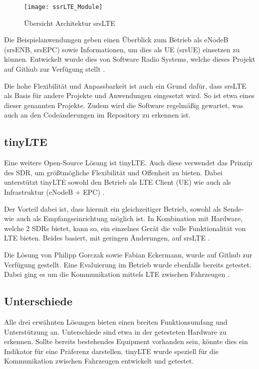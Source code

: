 \begin{figure*}[ht]
	\centering
	\texttt{[image: ssrLTE\_Module]}
	\caption{Übersicht Architektur srsLTE \protect\cite{puschmann2017implementing}}
	\label{fig:modulessrsLTE}
\end{figure*}

Die Beispielanwendungen geben einen Überblick zum Betrieb als eNodeB (srsENB, srsEPC) sowie Informationen, um dies als UE (srsUE) einsetzen zu können. Entwickelt wurde dies von Software Radio Systems, welche dieses Projekt auf Github zur Verfügung stellt \cite{githubSrSLTE}.

Die hohe Flexibilität und Anpassbarkeit ist auch ein Grund dafür, dass srsLTE als Basis für andere Projekte und Anwendungen eingesetzt wird. So ist etwa  eines dieser genannten Projekte. Zudem wird die Software regelmäßig gewartet, was auch an den Codeänderungen im Repository zu erkennen ist. 

\subsection{tinyLTE}
\label{tinyLTE}
Eine weitere Open-Source Lösung ist tinyLTE. Auch diese verwendet das Prinzip des SDR, um größtmögliche Flexibilität und Offenheit zu bieten. Dabei unterstützt tinyLTE sowohl den Betrieb als LTE Client (UE) wie auch als Infrastruktur (eNodeB + EPC) \cite{eckermann2018tinylte}.

Der Vorteil dabei ist, dass hiermit ein gleichzeitiger Betrieb, sowohl als Sende- wie auch als Empfangseinrichtung möglich ist. In Kombination mit Hardware, welche 2 SDRs bietet, kann so, ein einzelnes Gerät die volle Funktionalität von LTE bieten. 
Beides basiert, mit geringen Änderungen, auf srsLTE \cite{gomez2016srslte}. 

Die Lösung von Philipp Gorczak sowie Fabian Eckermann, wurde auf Github zur Verfügung gestellt. Eine Evaluierung im Betrieb wurde ebenfalls bereits getestet. Dabei ging es um die Kommunikation mittels LTE zwischen Fahrzeugen \cite{tinyLteGithub}. 

\subsection{Unterschiede}
Alle drei erwähnten Lösungen bieten einen breiten Funktionsumfang und Unterstützung an. Unterschiede sind etwa in der getesteten Hardware zu erkennen. Sollte bereits bestehendes Equipment vorhanden sein, könnte dies ein Indikator für eine Präferenz darstellen. 
tinyLTE wurde speziell für die Kommunikation zwischen Fahrzeugen entwickelt und getestet. 